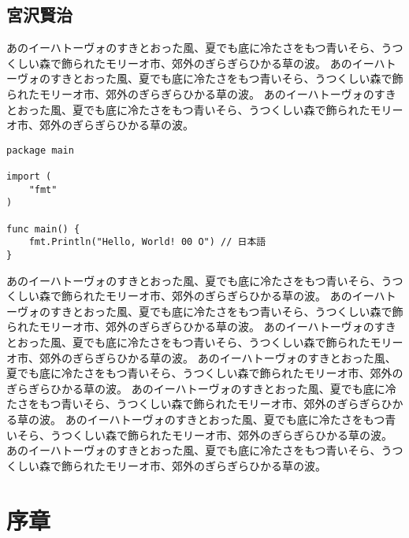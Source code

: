 \documentclass[b5j]{ltjsbook}
\begin{document}
\section*{宮沢賢治}

あのイーハトーヴォのすきとおった風、夏でも底に冷たさをもつ青いそら、うつくしい森で飾られたモリーオ市、郊外のぎらぎらひかる草の波。
あのイーハトーヴォのすきとおった風、夏でも底に冷たさをもつ青いそら、うつくしい森で飾られたモリーオ市、郊外のぎらぎらひかる草の波。
あのイーハトーヴォのすきとおった風、夏でも底に冷たさをもつ青いそら、うつくしい森で飾られたモリーオ市、郊外のぎらぎらひかる草の波。

\begin{verbatim}
package main

import (
    "fmt"
)

func main() {
    fmt.Println("Hello, World! 00 O") // 日本語
}
\end{verbatim}

あのイーハトーヴォのすきとおった風、夏でも底に冷たさをもつ青いそら、うつくしい森で飾られたモリーオ市、郊外のぎらぎらひかる草の波。
あのイーハトーヴォのすきとおった風、夏でも底に冷たさをもつ青いそら、うつくしい森で飾られたモリーオ市、郊外のぎらぎらひかる草の波。
あのイーハトーヴォのすきとおった風、夏でも底に冷たさをもつ青いそら、うつくしい森で飾られたモリーオ市、郊外のぎらぎらひかる草の波。
あのイーハトーヴォのすきとおった風、夏でも底に冷たさをもつ青いそら、うつくしい森で飾られたモリーオ市、郊外のぎらぎらひかる草の波。
あのイーハトーヴォのすきとおった風、夏でも底に冷たさをもつ青いそら、うつくしい森で飾られたモリーオ市、郊外のぎらぎらひかる草の波。
あのイーハトーヴォのすきとおった風、夏でも底に冷たさをもつ青いそら、うつくしい森で飾られたモリーオ市、郊外のぎらぎらひかる草の波。
あのイーハトーヴォのすきとおった風、夏でも底に冷たさをもつ青いそら、うつくしい森で飾られたモリーオ市、郊外のぎらぎらひかる草の波。

\tableofcontents
\mainmatter
{}

\chapter{序章}
\end{document}
